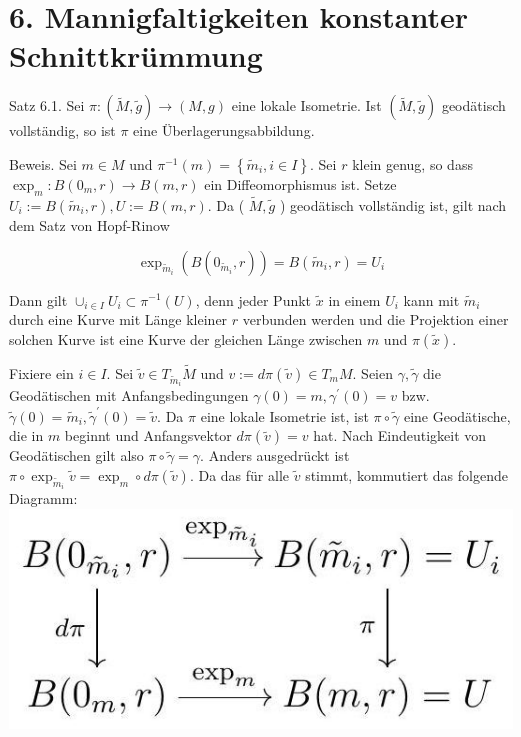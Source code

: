 \documentclass[10pt, letterpaper]{article}
\begin{document}
\section*{6. Mannigfaltigkeiten konstanter Schnittkrümmung}
Satz 6.1. Sei $\pi:(\tilde{M}, \tilde{g}) \rightarrow(M, g)$ eine lokale Isometrie. Ist $(\tilde{M}, \tilde{g})$ geodätisch vollständig, so ist $\pi$ eine Überlagerungsabbildung.

Beweis. Sei $m \in M$ und $\pi^{-1}(m)=\left\{\tilde{m}_{i}, i \in I\right\}$. Sei $r$ klein genug, so dass $\exp _{m}: B\left(0_{m}, r\right) \rightarrow B(m, r)$ ein Diffeomorphismus ist. Setze $U_{i}:=B\left(\tilde{m}_{i}, r\right), U:=B(m, r)$. Da ( $\tilde{M}, \tilde{g}$ ) geodätisch vollständig ist, gilt nach dem Satz von Hopf-Rinow

$$
\exp _{\tilde{m}_{i}}\left(B\left(0_{\tilde{m}_{i}}, r\right)\right)=B\left(\tilde{m}_{i}, r\right)=U_{i}
$$

Dann gilt $\cup_{i \in I} U_{i} \subset \pi^{-1}(U)$, denn jeder Punkt $\tilde{x}$ in einem $U_{i}$ kann mit $\tilde{m}_{i}$ durch eine Kurve mit Länge kleiner $r$ verbunden werden und die Projektion einer solchen Kurve ist eine Kurve der gleichen Länge zwischen $m$ und $\pi(\tilde{x})$.

Fixiere ein $i \in I$. Sei $\tilde{v} \in T_{\tilde{m}_{i}} \tilde{M}$ und $v:=d \pi(\tilde{v}) \in T_{m} M$. Seien $\gamma, \tilde{\gamma}$ die Geodätischen mit Anfangsbedingungen $\gamma(0)=m, \gamma^{\prime}(0)=v$ bzw. $\tilde{\gamma}(0)=\tilde{m}_{i}, \tilde{\gamma}^{\prime}(0)=\tilde{v}$. Da $\pi$ eine lokale Isometrie ist, ist $\pi \circ \tilde{\gamma}$ eine Geodätische, die in $m$ beginnt und Anfangsvektor $d \pi(\tilde{v})=v$ hat. Nach Eindeutigkeit von Geodätischen gilt also $\pi \circ \tilde{\gamma}=\gamma$. Anders ausgedrückt ist $\pi \circ \exp _{\tilde{m}_{i}} \tilde{v}=\exp _{m} \circ d \pi(\tilde{v})$. Da das für alle $\tilde{v}$ stimmt, kommutiert das folgende Diagramm:\\
\includegraphics[max width=\textwidth, center]{2025_05_20_3825c151ba0898b77b6eg-083}
\end{document}
